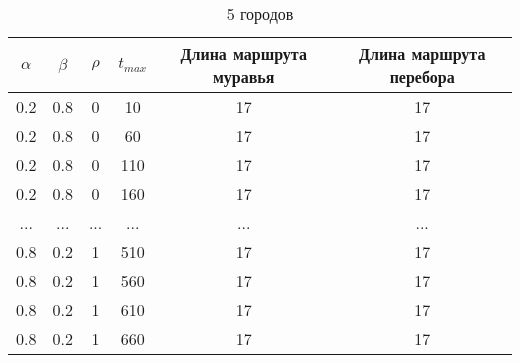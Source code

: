 \begin{table}[H]
    \centering
    \caption{5 городов}
    \label{table:city5}
    \begin{tabular}{|c|c|c|c|c|c|}
        \hline
        $\alpha$ & $\beta$ & $\rho$ & $t_{max}$ & Длина маршрута муравья & Длина маршрута перебора \\
        \hline
        0.2 & 0.8 & 0 & 10 & 17 & 17 \\
        0.2 & 0.8 & 0 & 60 & 17 & 17 \\
        0.2 & 0.8 & 0 & 110 & 17 & 17 \\
        0.2 & 0.8 & 0 & 160 & 17 & 17 \\
        ... & ... & ... & ... & ... & ... \\
        0.8 & 0.2 & 1 & 510 & 17 & 17 \\
        0.8 & 0.2 & 1 & 560 & 17 & 17 \\
        0.8 & 0.2 & 1 & 610 & 17 & 17 \\
        0.8 & 0.2 & 1 & 660 & 17 & 17 \\
        \hline
    \end{tabular}
\end{table}

